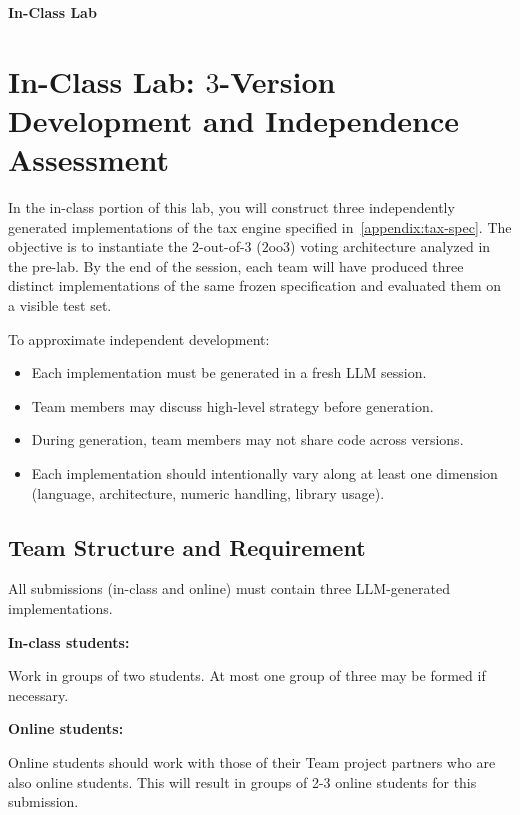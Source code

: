 \setcounter{section}{0}
\setcounter{subsection}{0}
\setcounter{subsubsection}{0}

\clearpage
\begin{center}
  {\Large\bfseries In-Class Lab}\\[0.5em]
\end{center}
\vspace{1em}

\section{In-Class Lab: $3$-Version Development and Independence Assessment}

In the in-class portion of this lab, you will construct three independently generated implementations of the tax engine specified in~\cref{appendix:tax-spec}.
The objective is to instantiate the $2$-out-of-$3$ ($2$oo$3$) voting architecture analyzed in the pre-lab.
By the end of the session, each team will have produced three distinct implementations of the same frozen specification and evaluated them on a visible test set.

To approximate independent development:

\begin{itemize}
  \item Each implementation must be generated in a fresh LLM session.
  \item Team members may discuss high-level strategy before generation.
  \item During generation, team members may not share code across versions.
  \item Each implementation should intentionally vary along at least one dimension (\eg language, architecture, numeric handling, library usage).
\end{itemize}

\subsection{Team Structure and Requirement}

All submissions (in-class and online) must contain three LLM-generated implementations.

\textbf{In-class students:}

Work in groups of two students.
At most one group of three may be formed if necessary.

\textbf{Online students:}

Online students should work with those of their Team project partners who are also online students.
This will result in groups of 2-3 online students for this submission.

